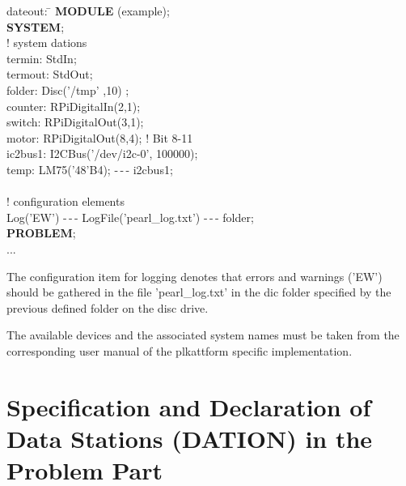 \begin{tabbing}
\x dateout: \= \kill
{\bf MODULE} (example); \> \\
{\bf SYSTEM}; \> \\
! system dations \\
\x termin:  \> StdIn; \\
\x termout: \> StdOut;\\
\x folder:  \> Disc('/tmp' ,10) ;  \\
\x counter: \> RPiDigitalIn(2,1); \\
\x switch:  \> RPiDigitalOut(3,1); \\
\x motor:   \> RPiDigitalOut(8,4); ! Bit 8-11\\
\x ic2bus1: \> I2CBus('/dev/i2c-0', 100000);\\
\x temp:    \> LM75('48'B4); -\,-\,- i2cbus1;\\
\x\\
! configuration elements \\
\x Log('EW') -\,-\,- LogFile('pearl\_log.txt') -\,-\,- folder; \\
{\bf PROBLEM};\> \\
\x ... \>
\end{tabbing}


The configuration item for logging denotes that errors and warnings ('EW')
should be gathered in the file 'pearl\_log.txt' in the dic folder specified
by the previous defined folder on the disc drive.

The available devices and the associated system names must be taken from
the corresponding user manual of the \OpenPEARL{} plkattform 
specific implementation.

\section{Specification and Declaration of Data Stations (DATION) in 
the Problem Part}   %
\label{sec_dation_problem_part}

